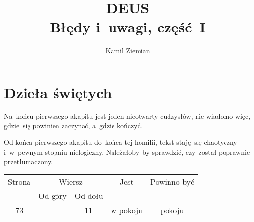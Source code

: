 \documentclass[a4paper,11pt]{article}
\title{DEUS \\
  {\Large Błędy i~uwagi, część~I}}
\author{Kamil Ziemian}
\begin{document}





\maketitle  %





\section{Dzieła świętych}

\vspace{\spaceTwo}




\vspace{0em}



\vspace{0em}


\noindent
{} Na~końcu pierwszego akapitu jest jeden nieotwarty
cudzysłów, nie wiadomo więc, gdzie~się powinien zaczynać, a~gdzie
kończyć.

\vspace{\spaceFour}





\noindent
{} Od końca pierwszego akapitu do~końca tej homilii,
tekst staję~się chaotyczny i~w~pewnym stopniu nielogiczny.
Należałoby~by sprawdzić, czy~został poprawnie przetłumaczony.






\vspace{\spaceFive}


\begin{center}

  \begin{tabular}{|c|c|c|c|c|}
    \hline
    Strona & \multicolumn{2}{c|}{Wiersz} & Jest
                              & Powinno być \\ \cline{2-3}
    & Od góry & Od dołu & & \\
    \hline
    73 & & 11 & w pokoju & pokoju \\
    \hline
  \end{tabular}

\end{center}
\end{document}

